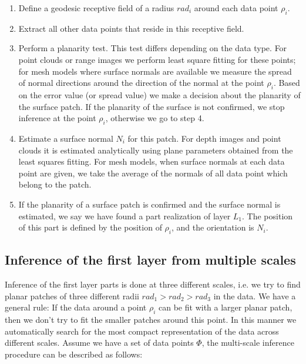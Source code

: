 \documentclass[conference]{IEEEtran}
\begin{document}
{\begin{enumerate}
\item Define a geodesic receptive field of a radius $rad_i$ around each data point $\rho_i$.
\item Extract all other data points that reside in this
receptive field.
\item Perform a planarity test. This test differs depending
on the data type. For point clouds or range images we perform least
square fitting for these points; for mesh models where surface
normals are available we measure the spread of normal directions
around the direction of the normal at the point $\rho_i$. Based on
the error value (or spread value) we make a decision about the
planarity of the surface patch. If the planarity of the surface is
not confirmed, we stop inference at the point $\rho_i$, otherwise we
go to step 4.
\item Estimate a surface normal $N_i$ for this patch. For depth images and point clouds it is
estimated analytically using plane parameters obtained from the
least squares fitting. For mesh models, when surface normals at each
data point are given, we take the average of the normals of all data
point which belong to the patch.
\item If the planarity of a surface patch is confirmed and the surface normal is
estimated, we say we have found a part realization of layer $L_1$.
The position of this part is defined by the position of $\rho_i$,
and the orientation is $N_i$.
\end{enumerate}


\subsection{Inference of the first layer from multiple scales\label{sec:InferenceFirstMultiple}}

Inference of the first layer parts is done at three different
scales, i.e. we try to find planar patches of three different radii
$rad_1 > rad_2 > rad_3$ in the data. We have a general rule: If the
data around a point $\rho_i$ can be fit with a larger planar patch,
then we don't try to fit the smaller patches around this point. In
this manner we automatically search for the most compact
representation of the data across different scales. Assume we have a
set of data points $\Phi$, the multi-scale inference procedure can
be described as follows:

\begin{enumerate}


\end{enumerate}}
\end{document}
